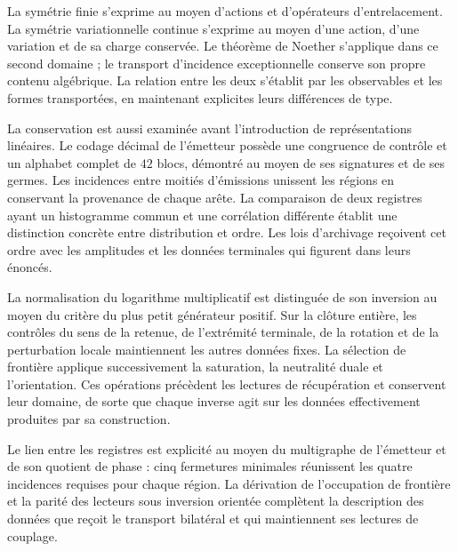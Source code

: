 La symétrie finie s’exprime au moyen d’actions et d’opérateurs d’entrelacement. La symétrie variationnelle continue s’exprime au moyen d’une action, d’une variation et de sa charge conservée. Le théorème de Noether s’applique dans ce second domaine ; le transport d’incidence exceptionnelle conserve son propre contenu algébrique. La relation entre les deux s’établit par les observables et les formes transportées, en maintenant explicites leurs différences de type.


La conservation est aussi examinée avant l’introduction de représentations
linéaires. Le codage décimal de l’émetteur possède une congruence de
contrôle et un alphabet complet de \(42\) blocs, démontré au moyen
de ses signatures et de ses germes. Les incidences entre moitiés d’émissions unissent
les régions en conservant la provenance de chaque arête. La comparaison
de deux registres ayant un histogramme commun et une corrélation différente établit
une distinction concrète entre distribution et ordre. Les lois d’archivage
reçoivent cet ordre avec les amplitudes et les données terminales
qui figurent dans leurs énoncés.

La normalisation du logarithme multiplicatif est distinguée de son
inversion au moyen du critère du plus petit générateur positif. Sur la
clôture entière, les contrôles du sens de la retenue, de l’extrémité terminale,
de la rotation et de la perturbation locale maintiennent les autres données fixes.
La sélection de frontière applique successivement la saturation, la neutralité
duale et l’orientation. Ces opérations précèdent les lectures de
récupération et conservent leur domaine, de sorte que chaque inverse agit
sur les données effectivement produites par sa construction.

Le lien entre les registres est explicité au moyen du multigraphe de
l’émetteur et de son quotient de phase : cinq fermetures minimales réunissent les quatre
incidences requises pour chaque région. La dérivation de l’occupation
de frontière et la parité des lecteurs sous inversion orientée
complètent la description des données que reçoit le transport bilatéral
et qui maintiennent ses lectures de couplage.

